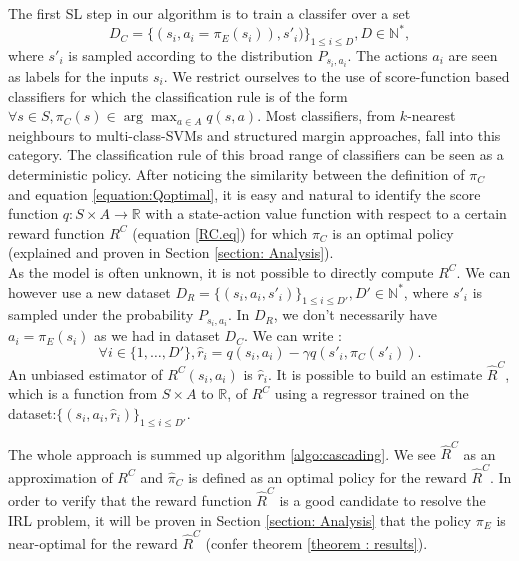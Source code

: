 \documentclass[11pt]{article}
\newcommand{\0}{\mathbf{0}}
\newcommand{\1}{\mathbf{1}}
\begin{document}
\label{section: Cascading}

The first SL step in our algorithm is to train a classifer over a set
\begin{equation}
\label{equation:data}
D_C=\{(s_i,a_i=\pi_E(s_i)),s'_i)\}_{1\leq i \leq D}, D\in\mathbb{N}^*,
\end{equation} where $s'_{i}$ is sampled according to the distribution $P_{s_{i},a_{i}}$. The actions $a_i$ are seen as labels for the inputs $s_i$. We restrict ourselves to the use of score-function based classifiers for which the classification rule is of the form $\forall s \in S, \pi_C(s) \in \arg\max_{a\in A} q(s,a)$. Most classifiers, from $k$-nearest neighbours to multi-class-SVMs and structured margin approaches, fall into this category. The classification rule of this broad range of classifiers can be seen as a deterministic policy. After noticing the similarity between the definition of $\pi_C$ and equation \eqref{equation:Qoptimal}, it is easy and natural to identify the score function $q:S\times A \rightarrow \mathbb{R}$ with a state-action value function with respect to a certain reward function $R^C$ (equation \eqref{RC.eq}) for which $\pi_C$ is an optimal policy (explained and proven in Section \ref{section: Analysis}).\\
As the model is often unknown, it is not possible to directly compute $R^C$. We can however use a new dataset $D_R=\{(s_{i},a_{i},s'_{i})\}_{1\leq i \leq D'}, D'\in\mathbb{N}^*$, where $s'_{i}$ is sampled under the probability $P_{s_{i},a_{i}}$. In $D_R$, we don't necessarily have $a_i = \pi_E(s_i)$ as we had in dataset $D_C$. We can write :
\begin{equation}
\label{ri.def}
 \forall i\in \{1,\dots,D'\},\hat{r}_i=q(s_{i},a_{i})-\gamma q(s'_{i},\pi_C(s'_{i})).
\end{equation}
An unbiased estimator of $R^C(s_i,a_i)$ is $\hat r_i$. It is possible to build an estimate $\hat{R}^C$, which is a function from $S\times A$ to $\mathbb{R}$, of $R^C$ using a regressor trained on the dataset:$\{(s_{i},a_{i},\hat{r}_i)\}_{1\leq i \leq D'}$.

The whole approach is summed up algorithm \ref{algo:cascading}. We see $\hat{R}^C$ as an approximation of $R^C$ and 
$\hat\pi_{C}$ is defined as an optimal policy for the reward $\hat{R}^C$.
In order to verify that the reward function $\hat{R}^C$ is a good candidate to resolve the IRL problem, it will be proven in Section \ref{section: Analysis} that the policy $\pi_E$ is near-optimal for the reward $\hat{R}^C$ (confer theorem \ref{theorem : results}).
\end{document}
